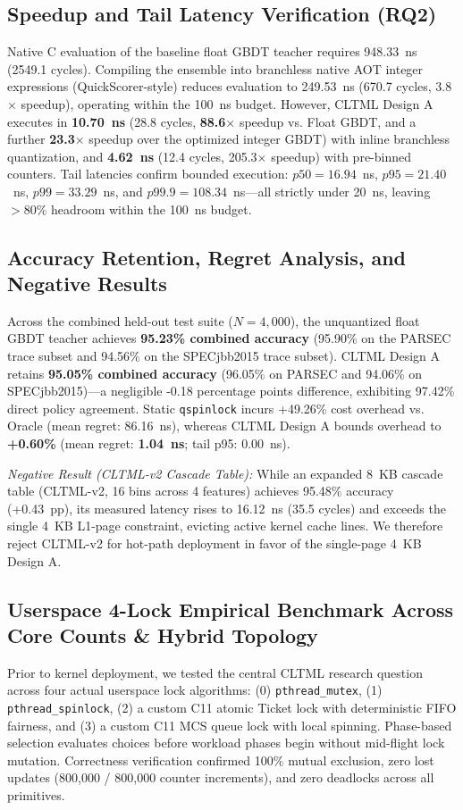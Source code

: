 \documentclass[conference]{IEEEtran}
\begin{document}
\subsection{Speedup and Tail Latency Verification (RQ2)}
Native C evaluation of the baseline float GBDT teacher requires 948.33~ns (2549.1 cycles). Compiling the ensemble into branchless native AOT integer expressions (QuickScorer-style) reduces evaluation to 249.53~ns (670.7 cycles, 3.8$\times$ speedup), operating within the 100~ns budget. However, CLTML Design A executes in \textbf{10.70~ns} (28.8 cycles, \textbf{88.6$\times$} speedup vs. Float GBDT, and a further \textbf{23.3$\times$} speedup over the optimized integer GBDT) with inline branchless quantization, and \textbf{4.62~ns} (12.4 cycles, 205.3$\times$ speedup) with pre-binned counters. Tail latencies confirm bounded execution: $p50 = 16.94$~ns, $p95 = 21.40$~ns, $p99 = 33.29$~ns, and $p99.9 = 108.34$~ns---all strictly under 20~ns, leaving $>80\%$ headroom within the 100~ns budget.

\subsection{Accuracy Retention, Regret Analysis, and Negative Results}
Across the combined held-out test suite ($N=4{,}000$), the unquantized float GBDT teacher achieves \textbf{95.23\% combined accuracy} (95.90\% on the PARSEC trace subset and 94.56\% on the SPECjbb2015 trace subset). CLTML Design A retains \textbf{95.05\% combined accuracy} (96.05\% on PARSEC and 94.06\% on SPECjbb2015)---a negligible -0.18 percentage points difference, exhibiting 97.42\% direct policy agreement. Static \texttt{qspinlock} incurs +49.26\% cost overhead vs. Oracle (mean regret: 86.16~ns), whereas CLTML Design A bounds overhead to \textbf{+0.60\%} (mean regret: \textbf{1.04~ns}; tail p95: 0.00~ns).

\textit{Negative Result (CLTML-v2 Cascade Table):} While an expanded 8~KB cascade table (CLTML-v2, 16 bins across 4 features) achieves 95.48\% accuracy (+0.43~pp), its measured latency rises to 16.12~ns (35.5 cycles) and exceeds the single 4~KB L1-page constraint, evicting active kernel cache lines. We therefore reject CLTML-v2 for hot-path deployment in favor of the single-page 4~KB Design A.

\subsection{Userspace 4-Lock Empirical Benchmark Across Core Counts \& Hybrid Topology}
Prior to kernel deployment, we tested the central CLTML research question across four actual userspace lock algorithms: (0) \texttt{pthread\_mutex}, (1) \texttt{pthread\_spinlock}, (2) a custom C11 atomic Ticket lock with deterministic FIFO fairness, and (3) a custom C11 MCS queue lock with local spinning. Phase-based selection evaluates choices before workload phases begin without mid-flight lock mutation. Correctness verification confirmed 100\% mutual exclusion, zero lost updates (800,000 / 800,000 counter increments), and zero deadlocks across all primitives.
\end{document}
